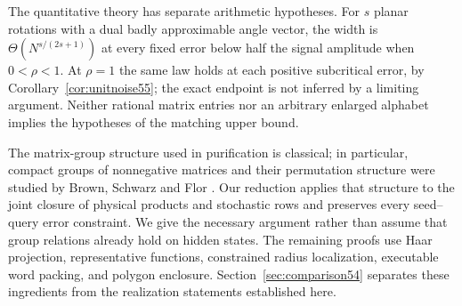 The quantitative theory has separate arithmetic hypotheses. For $s$ planar rotations with a dual badly approximable angle vector, the width is $\Theta(N^{s/(2s+1)})$ at every fixed error below half the signal amplitude when $0<\rho<1$. At $\rho=1$ the same law holds at each positive subcritical error, by Corollary~\ref{cor:unitnoise55}; the exact endpoint is not inferred by a limiting argument. Neither rational matrix entries nor an arbitrary enlarged alphabet implies the hypotheses of the matching upper bound.

The matrix-group structure used in purification is classical; in particular, compact groups of nonnegative matrices and their permutation structure were studied by Brown, Schwarz and Flor \cite{Flor}. Our reduction applies that structure to the joint closure of physical products and stochastic rows and preserves every seed--query error constraint. We give the necessary argument rather than assume that group relations already hold on hidden states. The remaining proofs use Haar projection, representative functions, constrained radius localization, executable word packing, and polygon enclosure. Section~\ref{sec:comparison54} separates these ingredients from the realization statements established here.
